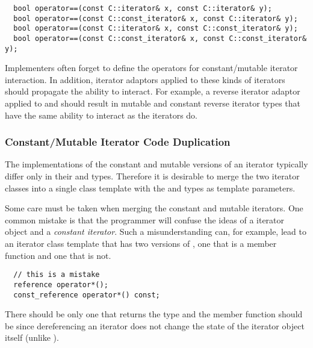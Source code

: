 \documentclass{netobjectdays}
\begin{document}
{\footnotesize
\begin{verbatim}
  bool operator==(const C::iterator& x, const C::iterator& y);
  bool operator==(const C::const_iterator& x, const C::iterator& y);
  bool operator==(const C::iterator& x, const C::const_iterator& y);
  bool operator==(const C::const_iterator& x, const C::const_iterator& y);
\end{verbatim}
}

Implementers often forget to define the operators for constant/mutable
iterator interaction. In addition, iterator adaptors applied to these
kinds of iterators should propagate the ability to interact. For
example, a reverse iterator adaptor applied to  and
 should result in mutable and constant reverse iterator types that
have the same ability to interact as the  iterators do.

\subsubsection{Constant/Mutable Iterator Code Duplication}


The implementations of the constant and mutable versions of an
iterator typically differ only in their  and
 types. Therefore it is desirable to merge the two
iterator classes into a single class template with the
 and  types as template parameters.

Some care must be taken when merging the constant and mutable
iterators.  One common mistake is that the programmer will confuse the
ideas of a  iterator object and a \emph{constant
iterator}. Such a misunderstanding can, for example, lead to an
iterator class template that has two versions of , one
that is a  member function and one that is not.
 
{\footnotesize
\begin{verbatim}
  // this is a mistake
  reference operator*();
  const_reference operator*() const;
\end{verbatim}
}

There should be only one  that returns the
 type and the member function should be  since
dereferencing an iterator does not change the state of the iterator
object itself (unlike ).
\end{document}
